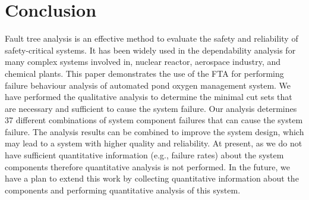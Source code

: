 \documentclass[10pt]{llncs}
\begin{document}
\section{Conclusion}
\label{sec:5}
Fault tree analysis is an effective method to evaluate the safety and reliability of safety-critical systems. It has been widely used in the dependability analysis for many complex systems involved in, nuclear reactor, aerospace industry, and chemical plants. This paper demonstrates the use of the FTA for performing failure behaviour analysis of automated pond oxygen management system. We have performed the qualitative analysis to determine the minimal cut sets that are necessary and sufficient to cause the system failure. Our analysis determines 37 different combinations of system component failures that can cause the system failure. The analysis results can be combined to improve the system design, which may lead to a system with higher quality and reliability. At present, as we do not have sufficient quantitative information (e.g., failure rates) about the system components therefore quantitative analysis is not performed. In the future, we have a plan to extend this work by collecting quantitative information about the components and performing quantitative analysis of this system.



\end{document}

